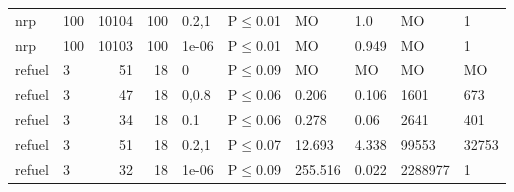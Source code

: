 \begin{longtable}{llrrllllll}
 nrp           & 100      &  	10104 & 100 & 0.2,1 & P$\leq$0.01  & MO       & 1.0      & MO      & 1      \\
 nrp           & 100      &  	10103 & 100 & 1e-06 & P$\leq$0.01  & MO       & 0.949    & MO      & 1      \\
 refuel        & 3        &     	51 &  18 & 0     & P$\leq$0.09  & MO       & MO       & MO      & MO     \\
 refuel        & 3        &     	47 &  18 & 0,0.8 & P$\leq$0.06  & 0.206    & 0.106    & 1601    & 673    \\
 refuel        & 3        &     	34 &  18 & 0.1   & P$\leq$0.06  & 0.278    & 0.06     & 2641    & 401    \\
 refuel        & 3        &     	51 &  18 & 0.2,1 & P$\leq$0.07  & 12.693   & 4.338    & 99553   & 32753  \\
 refuel        & 3        &     	32 &  18 & 1e-06 & P$\leq$0.09  & 255.516  & 0.022    & 2288977 & 1      \\
\bottomrule
\end{longtable}
